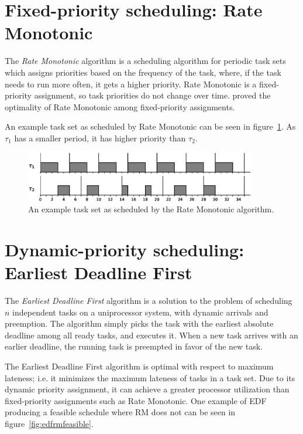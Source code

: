 \documentclass[twoside]{uva-inf-bachelor-thesis}
\begin{document}
\section{Fixed-priority scheduling: Rate Monotonic}
The \emph{Rate Monotonic} algorithm is a scheduling algorithm for periodic task sets which assigns priorities based on the frequency of the task, where, if the task needs to run more often, it gets a higher priority. Rate Monotonic is a fixed-priority assignment, so task priorities do not change over time. \textcite{Liu1973} proved the optimality of Rate Monotonic among fixed-priority assignments.

An example task set as scheduled by Rate Monotonic can be seen in figure~\ref{fig:rmexample}. As $\tau_1$ has a smaller period, it has higher priority than $\tau_2$.

\begin{figure}[htpb]
    \centering
    \includegraphics[width=0.9\textwidth]{rmexample.eps}
    \caption{An example task set as scheduled by the Rate Monotonic algorithm.}
    \label{fig:rmexample}
\end{figure}

\section{Dynamic-priority scheduling: Earliest Deadline First}
The \emph{Earliest Deadline First} algorithm is a solution to the problem of scheduling $n$ independent tasks on a uniprocessor system, with dynamic arrivals and preemption. The algorithm simply picks the task with the earliest absolute deadline among all ready tasks, and executes it. When a new task arrives with an earlier deadline, the running task is preempted in favor of the new task.

The Earliest Deadline First algorithm is optimal with respect to maximum lateness; i.e. it minimizes the maximum lateness of tasks in a task set. Due to its dynamic priority assignment, it can achieve a greater processor utilization than fixed-priority assignments such as Rate Monotonic. One example of EDF producing a feasible schedule where RM does not can be seen in figure~\ref{fig:edfrmfeasible}.
\end{document}
